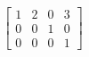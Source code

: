 \documentclass[preview]{standalone}
\begin{document}
\begin{align*}
\begin{bmatrix} 1 & 2 & 0 & 3 \\ 0 & 0 & 1 & 0 \\ 0 & 0 & 0 & 1 \end{bmatrix}
\end{align*}
\end{document}
